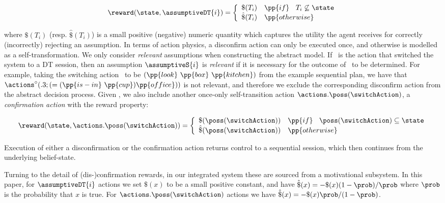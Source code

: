 \vspace{-1ex}
\small
\[
\reward(\state, \assumptiveDT{i}) = \bigg\{ \begin{array}{ll}
\$(T_i) & \pp{if}~\;\;T_i \not\subseteq \state \\
\hat\$(T_i) & \pp{otherwise} \\
\end{array}
\]
\normalsize

\vspace{-1ex}

\noindent where $\$(T_i)$ (resp. $\hat\$(T_i)$) is a small positive
(negative) numeric quantity which captures the utility the agent
receives for correctly (incorrectly) rejecting an assumption.  In
terms of action physics, a disconfirm action can only be executed
once, and otherwise is modelled as a self-transformation.  We only
consider {\em relevant} assumptions when constructing the abstract
model.  If \switchAction\ is the action that switched the system to a
DT session, then an assumption $\assumptiveS{i}$ is {\em relevant} if
it is necessary for the outcome of \switchAction\ to be
determined. For example, taking the switching action \switchAction\ to
be $(\pp{look}~\pp{box}~\pp{kitchen})$ from the example sequential
plan, we have that
$\actions^{\circ}(.3;(=(\pp{is-in}~\pp{cup})\pp{office}))$ is not
relevant, and therefore we exclude the corresponding disconfirm action
from the abstract decision process. Given \switchAction, we also
include another once-only self-transition action
$\actions.\poss(\switchAction)$, a \emph{confirmation action} with the
reward property:

\[
\reward(\state, \actions.\poss(\switchAction)) = \bigg\{ \begin{array}{ll}
\$(\poss(\switchAction)) & \pp{if}~\;\; \poss(\switchAction) \subseteq \state \\
\hat\$(\poss(\switchAction)) & \pp{otherwise} \\
\end{array}
\]

\noindent Execution of either a disconfirmation or the confirmation action
returns control to a sequential session, which then continues from the
underlying belief-state.

Turning to the detail of (dis-)confirmation rewards, in our integrated
system these are sourced from a motivational subsystem. In this paper,
for $\assumptiveDT{i}$ actions we set $\$(x)$ to be a small positive
constant, and have $\hat\$(x)= - \$(x)(1 - \prob) /
\prob$ where $\prob$ is the probability that $x$ is true. For
$\actions.\poss(\switchAction)$ actions we have $\hat\$(x)= -
\$(x)\prob/(1-\prob)$.


